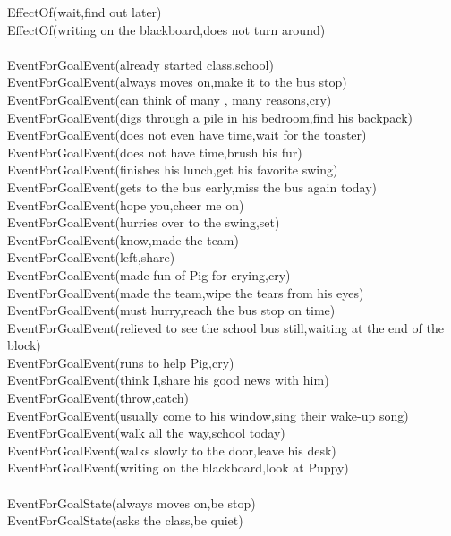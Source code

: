 \begin{multicols}{2}
\begin{footnotesize}
EffectOf(wait,find out later) \\
EffectOf(writing on the blackboard,does not turn around) \\
~\\
EventForGoalEvent(already started class,school) \\
EventForGoalEvent(always moves on,make it to the bus stop) \\
EventForGoalEvent(can think of many , many reasons,cry) \\
EventForGoalEvent(digs through a pile in his bedroom,find his backpack) \\
EventForGoalEvent(does not even have time,wait for the toaster) \\
EventForGoalEvent(does not have time,brush his fur) \\
EventForGoalEvent(finishes his lunch,get his favorite swing) \\
EventForGoalEvent(gets to the bus early,miss the bus again today) \\
EventForGoalEvent(hope you,cheer me on) \\
EventForGoalEvent(hurries over to the swing,set) \\
EventForGoalEvent(know,made the team) \\
EventForGoalEvent(left,share) \\
EventForGoalEvent(made fun of Pig for crying,cry) \\
EventForGoalEvent(made the team,wipe the tears from his eyes) \\
EventForGoalEvent(must hurry,reach the bus stop on time) \\
EventForGoalEvent(relieved to see the school bus still,waiting at the end of the block) \\
EventForGoalEvent(runs to help Pig,cry) \\
EventForGoalEvent(think I,share his good news with him) \\
EventForGoalEvent(throw,catch) \\
EventForGoalEvent(usually come to his window,sing their wake-up song) \\
EventForGoalEvent(walk all the way,school today) \\
EventForGoalEvent(walks slowly to the door,leave his desk) \\
EventForGoalEvent(writing on the blackboard,look at Puppy) \\
~\\
EventForGoalState(always moves on,be stop) \\
EventForGoalState(asks the class,be quiet) \\

\end{footnotesize}
\end{multicols}
